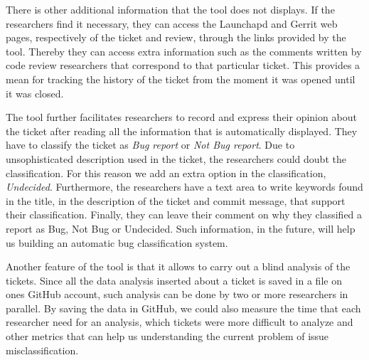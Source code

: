 \documentclass[runningheads,a4paper]{llncs}
\begin{document}
There is other additional information that the tool does not displays. If the researchers find it necessary, they can access the Launchapd and Gerrit web pages, respectively of the ticket and review, through the links provided by the tool. Thereby they can access extra information such as the comments written by code review researchers that correspond to that particular ticket. This provides a mean for tracking the history of the ticket from the moment it was opened until it was closed.

The tool further facilitates researchers to record and express their opinion about the ticket after reading all the information that is automatically displayed. They have to classify the ticket as \textit{Bug report} or \textit{Not Bug report}. Due to unsophisticated description used in the ticket, the researchers could doubt the classification. For this reason we add an extra option in the classification, \textit{Undecided}. Furthermore, the researchers have a text area to write keywords found in the title, in the description of the ticket and commit message, that support their classification.
Finally, they can leave their comment on why they classified a report as Bug, Not Bug or Undecided. Such information, in the future, will help us building an automatic bug classification system.

Another feature of the tool is that it allows to carry out a blind analysis of the tickets. Since all the data analysis inserted about a ticket is saved in a file on ones GitHub account, such analysis can be done by two or more researchers in parallel. By saving the data in GitHub, we could also measure the time that each researcher need for an analysis, which tickets were more difficult to analyze and other metrics that can help us understanding the current problem of issue misclassification.
\end{document}
